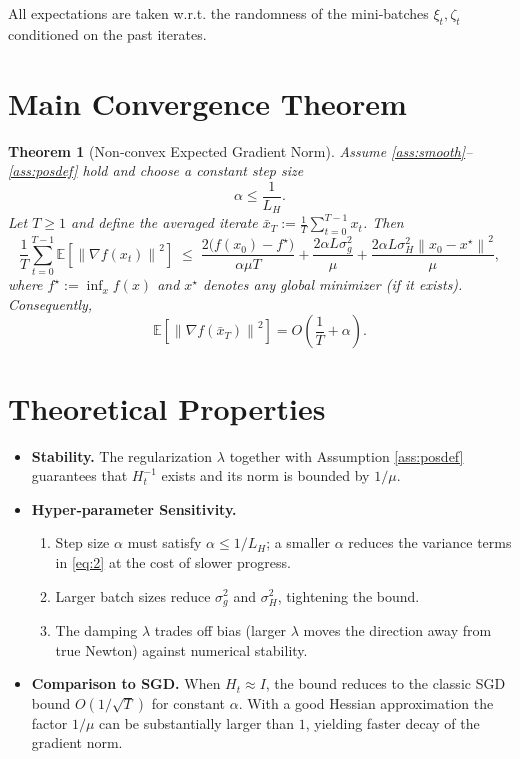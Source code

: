 \documentclass{article}
\newtheorem{theorem}{Theorem}
\newcommand{\E}{\mathbb{E}}
\newcommand{\norm}[1]{\left\lVert #1\right\rVert}
\begin{document}
All expectations are taken w.r.t. the randomness of the mini‑batches $\xi_t,\zeta_t$ conditioned on the past iterates.

\section*{Main Convergence Theorem}
\begin{theorem}[Non‑convex Expected Gradient Norm]\label{thm:main}
Assume \ref{ass:smooth}–\ref{ass:posdef} hold and choose a constant step size
\[
    \alpha\le \frac{1}{L_H}.
\]
Let $T\ge1$ and define the averaged iterate $\bar x_T:=\frac{1}{T}\sum_{t=0}^{T-1}x_t$. Then
\[
    \frac{1}{T}\sum_{t=0}^{T-1}\E\!\left[\norm{\nabla f(x_t)}^{2}\right]
    \;\le\;
    \frac{2\big(f(x_0)-f^\star\big)}{\alpha\mu T}
    +\frac{2\alpha L\sigma_g^{2}}{\mu}
    +\frac{2\alpha L\sigma_H^{2}\norm{x_0-x^\star}^{2}}{\mu},
\tag{2}
\]
where $f^\star:=\inf_{x}f(x)$ and $x^\star$ denotes any global minimizer (if it exists). Consequently,
\[
    \E\!\left[\norm{\nabla f(\bar x_T)}^{2}\right]=O\!\left(\frac{1}{T}+\alpha\right).
\]
\end{theorem}

\section*{Theoretical Properties}
\begin{itemize}
    \item \textbf{Stability.} The regularization $\lambda$ together with Assumption \ref{ass:posdef} guarantees that $H_t^{-1}$ exists and its norm is bounded by $1/\mu$.
    \item \textbf{Hyper‑parameter Sensitivity.}
    \begin{enumerate}[label=\alph*)]
        \item Step size $\alpha$ must satisfy $\alpha\le 1/L_H$; a smaller $\alpha$ reduces the variance terms in \eqref{eq:2} at the cost of slower progress.
        \item Larger batch sizes reduce $\sigma_g^2$ and $\sigma_H^2$, tightening the bound.
        \item The damping $\lambda$ trades off bias (larger $\lambda$ moves the direction away from true Newton) against numerical stability.
    \end{enumerate}
    \item \textbf{Comparison to SGD.} When $H_t\approx I$, the bound reduces to the classic SGD bound $O(1/\sqrt{T})$ for constant $\alpha$. With a good Hessian approximation the factor $1/\mu$ can be substantially larger than $1$, yielding faster decay of the gradient norm.
\end{itemize}
\end{document}
